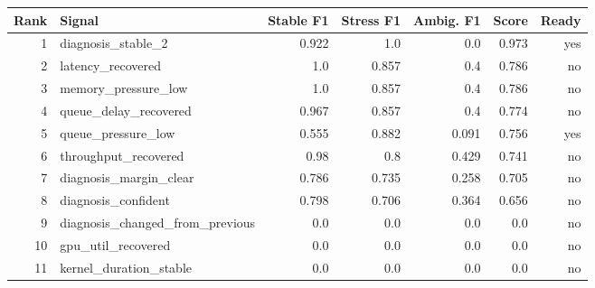 \begin{tabular}{rlrrrrr}
\hline
Rank & Signal & Stable F1 & Stress F1 & Ambig. F1 & Score & Ready \\
\hline
1 & diagnosis_stable_2 & 0.922 & 1.0 & 0.0 & 0.973 & yes \\
2 & latency_recovered & 1.0 & 0.857 & 0.4 & 0.786 & no \\
3 & memory_pressure_low & 1.0 & 0.857 & 0.4 & 0.786 & no \\
4 & queue_delay_recovered & 0.967 & 0.857 & 0.4 & 0.774 & no \\
5 & queue_pressure_low & 0.555 & 0.882 & 0.091 & 0.756 & yes \\
6 & throughput_recovered & 0.98 & 0.8 & 0.429 & 0.741 & no \\
7 & diagnosis_margin_clear & 0.786 & 0.735 & 0.258 & 0.705 & no \\
8 & diagnosis_confident & 0.798 & 0.706 & 0.364 & 0.656 & no \\
9 & diagnosis_changed_from_previous & 0.0 & 0.0 & 0.0 & 0.0 & no \\
10 & gpu_util_recovered & 0.0 & 0.0 & 0.0 & 0.0 & no \\
11 & kernel_duration_stable & 0.0 & 0.0 & 0.0 & 0.0 & no \\
\hline
\end{tabular}
